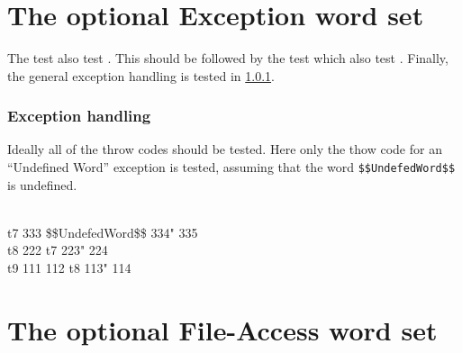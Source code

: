  \\
 \\
 \\



\section{The optional Exception word set} %

The test  also test .  This should
be followed by the test  which also test
.  Finally, the general exception handling is tested in
\ref{test:throw}.

\setcounter{subsection}{3}
\setcounter{subsubsection}{5}
\subsubsection{Exception handling}
\label{test:throw}

Ideally all of the throw codes should be tested.  Here only the
thow code for an ``Undefined Word'' exception is tested, assuming
that the word \texttt{\$\$UndefedWord\$\$} is undefined.

\begin{tt}
 \\
\word{:} t7  333 \$\$UndefedWord\$\$ 334"  335 \word{;} \\
\word{:} t8  222 t7 223"  224 \word{;} \\
\word{:} t9  111 112 t8 113"  114 \word{;}
\end{tt}






\section{The optional File-Access word set} %

